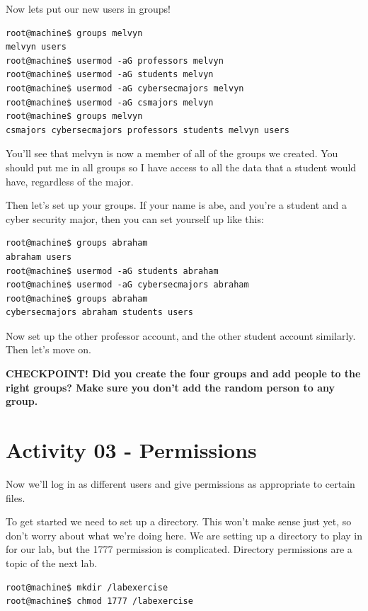 \documentclass[12pt,a4]{article}
\begin{document}
Now lets put our new users in groups!
\begin{lstlisting}[style=Term, label=listing:awk, caption={Let's verify that the groups were created}]
root@machine$ groups melvyn
melvyn users
root@machine$ usermod -aG professors melvyn
root@machine$ usermod -aG students melvyn
root@machine$ usermod -aG cybersecmajors melvyn
root@machine$ usermod -aG csmajors melvyn
root@machine$ groups melvyn
csmajors cybersecmajors professors students melvyn users
\end{lstlisting}

You'll see that melvyn is now a member of all of the groups we created. You should put me in all groups so I have access to all the data that a student would have, regardless of the major.

Then let's set up your groups. If your name is abe, and you're a student and a cyber security major, then you can set yourself up like this:
\begin{lstlisting}[style=Term, label=listing:awk, caption={Add yourself to the proper groups}]
root@machine$ groups abraham
abraham users
root@machine$ usermod -aG students abraham
root@machine$ usermod -aG cybersecmajors abraham
root@machine$ groups abraham
cybersecmajors abraham students users
\end{lstlisting}

Now set up the other professor account, and the other student account similarly.
Then let's move on.

\newpage

\textbf{CHECKPOINT! Did you create the four groups and add people to the right groups? Make sure you don't add the random person to any group.}

\newpage 


\section{Activity 03 - Permissions}
Now we'll log in as different users and give permissions as appropriate to certain files.

To get started we need to set up a directory. This won't make sense just yet, so don't worry about what we're doing here. We are setting up a directory to play in for our lab, but the 1777 permission is complicated. Directory permissions are a topic of the next lab.

\begin{lstlisting}[style=Term, label=listing:awk, caption={Going to modify directory permissions here, don't worry about this yet. Today we are just learning file permissions}]
root@machine$ mkdir /labexercise
root@machine$ chmod 1777 /labexercise
\end{lstlisting}
\end{document}
